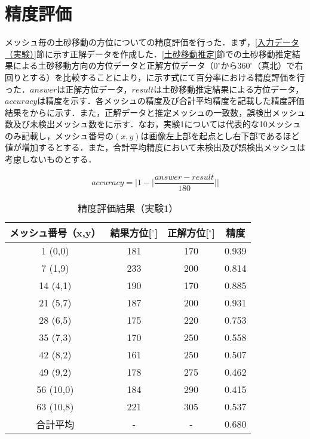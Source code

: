   \section{精度評価}
    メッシュ毎の土砂移動の方位についての精度評価を行った．まず，\ref{入力データ（実験）}節に示す正解データを作成した．\ref{土砂移動推定}節での土砂移動推定結果による土砂移動方向の方位データと正解方位データ（$0^\circ$から$360^\circ$（真北）で右回りとする）を比較することにより，に示す式にて百分率における精度評価を行った．$answer$は正解方位データ，$result$は土砂移動推定結果による方位データ，$accuracy$は精度を示す．各メッシュの精度及び合計平均精度を記載した精度評価結果をからに示す．また，正解データと推定メッシュの一致数，誤検出メッシュ数及び未検出メッシュ数をに示す．なお，実験1については代表的な10メッシュのみ記載し，メッシュ番号の$(x,y)$は画像左上部を起点とし右下部であるほど値が増加するとする．また，合計平均精度において未検出及び誤検出メッシュは考慮しないものとする．

    \begin{equation}
      \label{精度評価}
      accuracy = |1 - |\dfrac{answer - result} {180}||
    \end{equation}

    \begin{table}[tbp]
      \centering
      \caption{精度評価結果（実験1）}
      \label{精度評価結果（実験1）}
      \begin{tabular}{cccc}
        \hline
        \textbf{メッシュ番号（x,y）} & \textbf{結果方位[$^{\circ}$]} & \textbf{正解方位[$^{\circ}$]} & \textbf{精度} \\
        \hline  \hline
        1 (0,0) & 181 & 170 & 0.939 \\
        7 (1,9) & 233 & 200 & 0.814 \\
        14 (4,1) & 190 & 170 & 0.885 \\
        21 (5,7) & 187 & 200 & 0.931 \\
        28 (6,5) & 175 & 220 & 0.753 \\
        35 (7,3) & 170 & 250 & 0.558 \\
        42 (8,2) & 161 & 250 & 0.507 \\
        49 (9,2) & 178 & 275 & 0.462 \\
        56 (10,0) & 184 & 290 & 0.415 \\
        63 (10,8) & 221 & 305 & 0.537 \\
        合計平均 & - & - & 0.680 \\
        \hline
      \end{tabular}
    \end{table}

